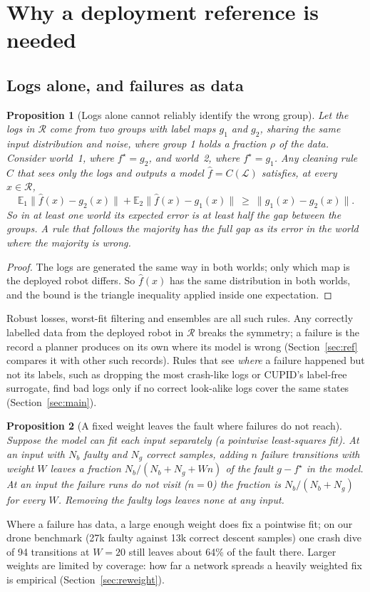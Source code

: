 \documentclass[preprint,12pt]{elsarticle}
\newcommand{\E}{\mathbb{E}}
\newtheorem{proposition}{Proposition}
\begin{document}
\section{Why a deployment reference is needed}\label{sec:analysis}

\subsection{Logs alone, and failures as data}

\begin{proposition}[Logs alone cannot reliably identify the wrong group]\label{prop:ident}
Let the logs in $\mathcal{R}$ come from two groups with label maps $g_1$ and $g_2$, sharing the same input distribution and noise, where group 1 holds a fraction $\rho$ of the data. Consider world~1, where $f^\star=g_2$, and world~2, where $f^\star=g_1$. Any cleaning rule $C$ that sees only the logs and outputs a model $\hat f=C(\mathcal{L})$ satisfies, at every $x\in\mathcal{R}$,
\begin{equation}
\E_1\|\hat f(x)-g_2(x)\|+\E_2\|\hat f(x)-g_1(x)\|\ \ge\ \|g_1(x)-g_2(x)\|.
\end{equation}
So in at least one world its expected error is at least half the gap between the groups. A rule that follows the majority has the full gap as its error in the world where the majority is wrong.
\end{proposition}
\begin{proof}
The logs are generated the same way in both worlds; only which map is the deployed robot differs. So $\hat f(x)$ has the same distribution in both worlds, and the bound is the triangle inequality applied inside one expectation.
\end{proof}
Robust losses, worst-fit filtering and ensembles are all such rules. Any correctly labelled data from the deployed robot in $\mathcal{R}$ breaks the symmetry; a failure is the record a planner produces on its own where its model is wrong (Section~\ref{sec:ref} compares it with other such records). Rules that see \emph{where} a failure happened but not its labels, such as dropping the most crash-like logs or CUPID's label-free surrogate, find bad logs only if no correct look-alike logs cover the same states (Section~\ref{sec:main}).

\begin{proposition}[A fixed weight leaves the fault where failures do not reach]\label{prop:add}
Suppose the model can fit each input separately (a pointwise least-squares fit). At an input with $N_b$ faulty and $N_g$ correct samples, adding $n$ failure transitions with weight $W$ leaves a fraction $N_b/(N_b+N_g+Wn)$ of the fault $g-f^\star$ in the model. At an input the failure runs do not visit ($n=0$) the fraction is $N_b/(N_b+N_g)$ for every $W$. Removing the faulty logs leaves none at any input.
\end{proposition}
Where a failure has data, a large enough weight does fix a pointwise fit; on our drone benchmark (27k faulty against 13k correct descent samples) one crash dive of 94 transitions at $W=20$ still leaves about 64\% of the fault there. Larger weights are limited by coverage: how far a network spreads a heavily weighted fix is empirical (Section~\ref{sec:reweight}).
\end{document}
